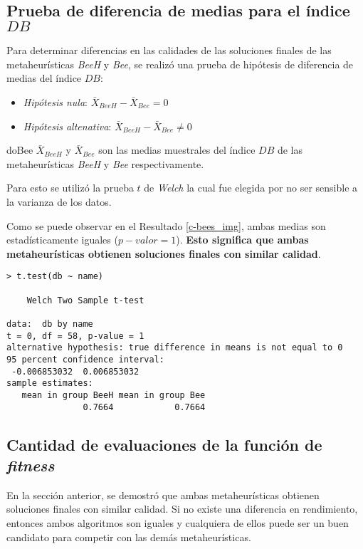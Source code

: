 \subsection{Prueba de diferencia de medias para el índice $DB$}

    Para determinar diferencias en las calidades de las soluciones finales de las
metaheurísticas \emph{BeeH} y \emph{Bee}, se realizó una prueba de hipótesis de
diferencia de medias del índice $DB$:
\begin{itemize}
    \item \emph{Hipótesis nula}: $\bar{X}_{BeeH} - \bar{X}_{Bee} = 0$
    \item \emph{Hipótesis altenativa}: $\bar{X}_{BeeH} - \bar{X}_{Bee} \neq 0$
\end{itemize}
doBee $\bar{X}_{BeeH}$ y $\bar{X}_{Bee}$ son las medias muestrales del índice
$DB$ de las metaheurísticas \emph{BeeH} y \emph{Bee} respectivamente.

    Para esto se utilizó la prueba $t$ de \emph{Welch} \cite{AB_0} la cual fue
elegida por no ser sensible a la varianza de los datos.

	Como se puede observar en el Resultado \ref{c-bees_img}, ambas medias son
estadísticamente iguales ($p-valor = 1$). { \bf Esto significa que ambas
metaheurísticas obtienen soluciones finales con similar calidad}.

\begin{lstlisting}[float=h!, caption={Diferencia de Medias: Índice \emph{DB}}, label=c-bees_img]
> t.test(db ~ name)

	Welch Two Sample t-test

data:  db by name 
t = 0, df = 58, p-value = 1
alternative hypothesis: true difference in means is not equal to 0 
95 percent confidence interval:
 -0.006853032  0.006853032 
sample estimates:
   mean in group BeeH mean in group Bee 
               0.7664            0.7664
\end{lstlisting}

\subsection{Cantidad de evaluaciones de la función de \emph{fitness}}

	En la sección anterior, se demostró que ambas metaheurísticas obtienen
soluciones finales con similar calidad. Si no existe una diferencia en
rendimiento, entonces ambos algoritmos son iguales y cualquiera de ellos puede
ser un buen candidato para competir con las demás metaheurísticas.

